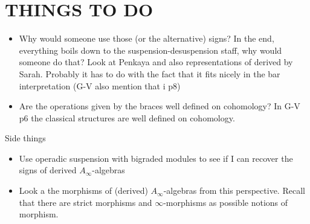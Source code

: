 \documentclass[twoside]{article}
\begin{document}
\section{THINGS TO DO}

\begin{itemize}
\item Why would someone use those (or the alternative) signs? In the end, everything boils down to the suspension-desuspension staff, why would someone do that? Look at Penkaya and also representations of derived by Sarah. Probably it has to do with the fact that it fits nicely in the bar interpretation (G-V also mention that i p8)
\item Are the operations given by the braces well defined on cohomology? In G-V p6 the classical structures are well defined on cohomology.
\end{itemize}

Side things
\begin{itemize}
\item Use operadic suspension with bigraded modules to see if I can recover the signs of derived $A_\infty$-algebras
\item Look a the morphisms of (derived) $A_\infty$-algebras from this perspective. Recall that there are strict morphisms and $\infty$-morphisms as possible notions of morphism.


\end{itemize}
\end{document}
